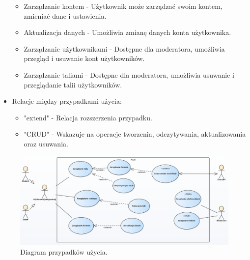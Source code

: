 \begin{itemize}
\begin{itemize}
                                \item Zarządzanie kontem - Użytkownik może zarządzać swoim kontem, zmieniać dane i ustawienia.
                                \item Aktualizacja danych - Umożliwia zmianę danych konta użytkownika.
                                \item Zarządzanie użytkownikami - Dostępne dla moderatora, umożliwia przegląd i usuwanie kont użytkowników.
                                \item Zarządzanie taliami - Dostępne dla moderatora, umożliwia usuwanie i przeglądanie talii użytkowników.
    \end{itemize}
    \item Relacje między przypadkami użycia: \begin{itemize}
                                                 \item "extend" - Relacja rozszerzenia przypadku.
                                                 \item "CRUD" - Wskazuje na operacje tworzenia, odczytywania, aktualizowania oraz usuwania.
    \end{itemize}
\end{itemize}

\begin{figure}[H]
    \centering
    \includegraphics[width=1\textwidth]{chapters/chapter_6/diagram_przypadkow_uzycia}
    \caption{Diagram przypadków użycia.}
    \label{img:diagram_przypadkow_uzycia}
\end{figure}


\setlength{\parindent}{15pt}


